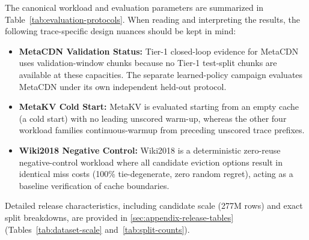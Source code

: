

The canonical workload and evaluation parameters are summarized in Table~\ref{tab:evaluation-protocols}. When reading and interpreting the results, the following trace-specific design nuances should be kept in mind:
\begin{itemize}[leftmargin=*]
  \item \textbf{MetaCDN Validation Status:} Tier-1 closed-loop evidence for MetaCDN uses validation-window chunks because no Tier-1 test-split chunks are available at these capacities. The separate learned-policy campaign evaluates MetaCDN under its own independent held-out protocol.
  \item \textbf{MetaKV Cold Start:} MetaKV is evaluated starting from an empty cache (a cold start) with no leading unscored warm-up, whereas the other four workload families continuous-warmup from preceding unscored trace prefixes.
  \item \textbf{Wiki2018 Negative Control:} Wiki2018 is a deterministic zero-reuse negative-control workload where all candidate eviction options result in identical miss costs (100\% tie-degenerate, zero random regret), acting as a baseline verification of cache boundaries.
\end{itemize}

Detailed release characteristics, including candidate scale (277M rows) and exact split breakdowns, are provided in \ref{sec:appendix-release-tables} (Tables~\ref{tab:dataset-scale} and~\ref{tab:split-counts}).
